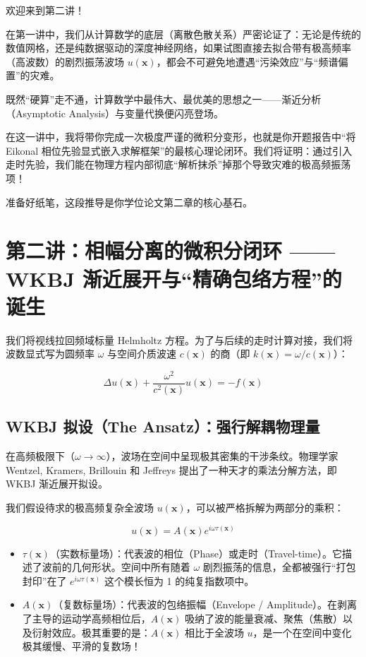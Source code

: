 \documentclass[12pt]{article}
\begin{document}
{欢迎来到第二讲！

在第一讲中，我们从计算数学的底层（离散色散关系）严密论证了：无论是传统的数值网格，还是纯数据驱动的深度神经网络，如果试图直接去拟合带有极高频率（高波数）的剧烈振荡波场 $u(\mathbf{x})$，都会不可避免地遭遇“污染效应”与“频谱偏置”的灾难。

既然“硬算”走不通，计算数学中最伟大、最优美的思想之一——渐近分析（Asymptotic Analysis）与变量代换便闪亮登场。

在这一讲中，我将带你完成一次极度严谨的微积分变形，也就是你开题报告中“将 Eikonal 相位先验显式嵌入求解框架”的最核心理论闭环。我们将证明：通过引入走时先验，我们能在物理方程内部彻底“解析抹杀”掉那个导致灾难的极高频振荡项！

准备好纸笔，这段推导是你学位论文第二章的核心基石。

\section{第二讲：相幅分离的微积分闭环 —— WKBJ 渐近展开与“精确包络方程”的诞生}

我们将视线拉回频域标量 Helmholtz 方程。为了与后续的走时计算对接，我们将波数显式写为圆频率 $\omega$ 与空间介质波速 $c(\mathbf{x})$ 的商（即 $k(\mathbf{x}) = \omega/c(\mathbf{x})$）：

\begin{equation}
\Delta u(\mathbf{x}) + \frac{\omega^2}{c^2(\mathbf{x})} u(\mathbf{x}) = -f(\mathbf{x})
\label{eq:2-1}
\end{equation}

\subsection{WKBJ 拟设（The Ansatz）：强行解耦物理量}

在高频极限下（$\omega \to \infty$），波场在空间中呈现极其密集的干涉条纹。物理学家 Wentzel, Kramers, Brillouin 和 Jeffreys 提出了一种天才的乘法分解方法，即 WKBJ 渐近展开拟设。

我们假设待求的极高频复杂全波场 $u(\mathbf{x})$，可以被严格拆解为两部分的乘积：

\begin{equation}
u(\mathbf{x}) = A(\mathbf{x}) e^{i \omega \tau(\mathbf{x})}
\label{eq:2-2}
\end{equation}

\begin{itemize}[leftmargin=2em]
    \item $\tau(\mathbf{x})$（实数标量场）：代表波的相位（Phase）或走时（Travel-time）。它描述了波前的几何形状。空间中所有随着 $\omega$ 剧烈振荡的信息，全都被强行“打包封印”在了 $e^{i \omega \tau(\mathbf{x})}$ 这个模长恒为 1 的纯复指数项中。
    \item $A(\mathbf{x})$（复数标量场）：代表波的包络振幅（Envelope / Amplitude）。在剥离了主导的运动学高频相位后，$A(\mathbf{x})$ 吸纳了波的能量衰减、聚焦（焦散）以及衍射效应。极其重要的是：$A(\mathbf{x})$ 相比于全波场 $u$，是一个在空间中变化极其缓慢、平滑的复数场！
\end{itemize}

}
\end{document}
